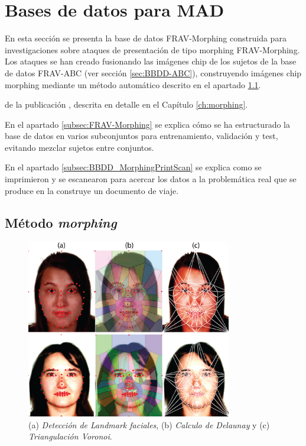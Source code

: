 \section{Bases de datos para MAD}\label{sec:BBDD_Morphing}

En esta sección se presenta la base de datos \Gls{FRAV-Morphing} construida para investigaciones sobre ataques de presentación de tipo \gls{morphing} \Gls{FRAV-Morphing}. Los ataques se han creado fusionando las imágenes \gls{chip} de los sujetos de la base de datos \Gls{FRAV-ABC} (ver sección \ref{sec:BBDD-ABC}), construyendo imágenes \gls{chip morphing} mediante un método automático descrito en el apartado \ref{subsec:MorphingMethods}.

de la publicación \cite{ortega2020border}, descrita en detalle en el Capítulo \ref{ch:morphing}.  

En el apartado \ref{subsec:FRAV-Morphing} se explica cómo se ha estructurado la base de datos en varios subconjuntos para entrenamiento, validación y test, evitando mezclar sujetos entre conjuntos.

En el apartado \ref{subsec:BBDD_MorphingPrintScan} se explica como se imprimieron y se escanearon para acercar los datos a la problemática real que se produce en la construye un documento de viaje.

\subsection{Método \textit{morphing}}\label{subsec:MorphingMethods}

\begin{figure}[ht]
     \centering
     \includegraphics[width=0.8\textwidth]{ch-sistemasABC/images/ch-morphing/TRIANGULACION-CHIP-BEA-CRISTINA.png}
     \caption{(a) \textit{Detección de Landmark faciales}, (b) \textit{Calculo de Delaunay} y (c) \textit{Triangulación Voronoi}.}
     \label{fig:LandmarckDVTriangualtion}
\end{figure}

